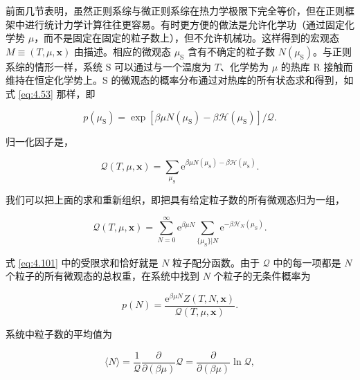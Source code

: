 前面几节表明，虽然正则系综与微正则系综在热力学极限下完全等价，但在正则框架中进行统计力学计算往往更容易。有时更方便的做法是允许化学功（通过固定化学势 $\mu$，而不是固定在固定的粒子数上），但不允许机械功。这样得到的宏观态 $M\equiv(T,\mu,\mathbf x)$ 由描述。相应的微观态 $\mu_{\text{S}}$ 含有不确定的粒子数 $N(\mu_{\text{S}})$。与正则系综的情形一样，系统 S 可以通过与一个温度为 $T$、化学势为 $\mu$ 的热库 R 接触而维持在恒定化学势上。S 的微观态的概率分布通过对热库的所有状态求和得到，如式 \eqref{eq:4.53} 那样，即

\begin{equation}\label{eq:4.99}
  p(\mu_{\text{S}})=\exp\left[\beta\mu N(\mu_{\text{S}})-\beta\mathscr H(\mu_{\text{S}})\right]/\mathcal{Q}.
\end{equation}

归一化因子是，

\begin{equation}\label{eq:4.100}
  \mathcal{Q}(T,\mu,\mathbf x)=\sum_{\mu_{\text{S}}}\mathrm{e}^{\beta\mu N(\mu_{\text{S}})-\beta\mathscr H(\mu_{\text{S}})}.
\end{equation}


我们可以把上面的求和重新组织，即把具有给定粒子数的所有微观态归为一组，

\begin{equation}\label{eq:4.101}
  \mathcal{Q}(T,\mu,\mathbf x)=\sum_{N=0}^\infty\mathrm{e}^{\beta\mu N}\sum_{\{\mu_{\text{S}}\}|N}\mathrm{e}^{-\beta\mathscr H_N(\mu_{\text{S}})}.
\end{equation}

式 \eqref{eq:4.101} 中的受限求和恰好就是 $N$ 粒子配分函数。由于 $\mathcal{Q}$ 中的每一项都是 $N$ 个粒子的所有微观态的总权重，在系统中找到 $N$ 个粒子的无条件概率为

\begin{equation}\label{eq:4.102}
  p(N)=\frac{\mathrm{e}^{\beta\mu N}Z(T,N,\mathbf x)}{\mathcal{Q}(T,\mu,\mathbf x)}.
\end{equation}

系统中粒子数的平均值为

\begin{equation}\label{eq:4.103}
  \langle N\rangle=\frac{1}{\mathcal{Q}}\frac{\partial}{\partial(\beta\mu)}\mathcal{Q}=\frac{\partial}{\partial(\beta\mu)}\ln\mathcal{Q},
\end{equation}

